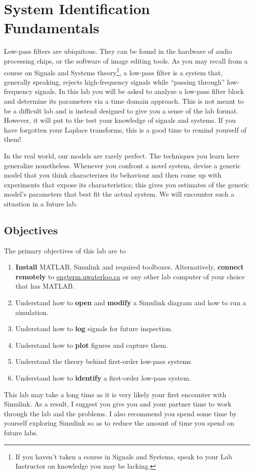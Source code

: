 \chapter{System Identification Fundamentals}\label{Lab:1}
Low-pass filters are ubiquitous. They can be found in the hardware of
audio processing chips, or the software of image editing tools. As you may
recall from a course on Signals and Systems theory\footnote{If you haven't
taken a course in Signals and Systems, speak to your Lab Instructor on
knowledge you may be lacking.}, a low-pass filter
is a system that, generally speaking, rejects high-frequency signals while
``passing through'' low-frequency signals. In this lab you will be asked
to analyze a low-pass filter block and determine its parameters via a time
domain approach. This is not meant to be a difficult lab and is instead
designed to give you a sense of the lab format. However, it will put to the
test your knowledge of signals and systems. If you have forgotten your
Laplace transforms, this is a good time to remind yourself of them!

In the real world, our models are rarely perfect. The techniques
you learn here generalize nonetheless. Whenever you confront a novel system,
devise a generic model that you think characterizes its behaviour and then
come up with experiments that expose its characteristics; this gives you
estimates of the generic model's parameters that best fit the actual system.
We will encounter such a situation in a future lab.

\section{Objectives}
The primary objectives of this lab are to
\begin{enumerate}[label=(\arabic*)]
  \item{
    \textbf{Install} MATLAB, Simulink and required toolboxes.
    Alternatively, \textbf{connect remotely} to
    \url{engterm.uwaterloo.ca} or any other lab computer of your choice
    that has MATLAB.
  }
  \item{
    Understand how to \textbf{open} and \textbf{modify}
    a Simulink diagram and how to run a simulation.
  }
  \item{
    Understand how to \textbf{log} signals for future inspection.
  }
  \item{
    Understand how to \textbf{plot} figures and capture them.
  }
  \item{
    Understand the theory behind first-order low-pass systems.
  }
  \item{
    Understand how to \textbf{identify} a first-order low-pass system.
  }
\end{enumerate}
This lab may take a long time as it is very likely your first encounter with Simulink.
As a result, I suggest you give you and your partner time to work through the lab and the problems.
I also recommend you spend some time by yourself exploring Simulink so as to reduce the amount of time you spend on future labs.

